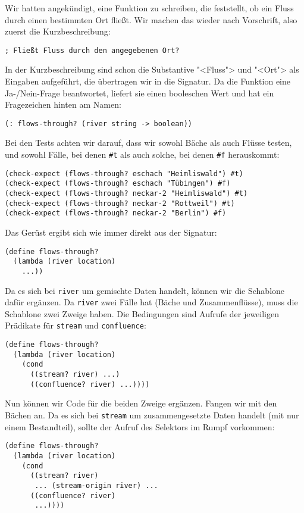%
Wir hatten angekündigt, eine Funktion zu schreiben, die feststellt, ob
ein Fluss durch einen bestimmten Ort fließt.  Wir machen das wieder
nach Vorschrift, also zuerst die Kurzbeschreibung:
%
\begin{lstlisting}
; Fließt Fluss durch den angegebenen Ort?
\end{lstlisting}
%
In der Kurzbeschreibung sind schon die Substantive "<Fluss"> und
"<Ort"> als Eingaben aufgeführt, die übertragen wir in die Signatur.
Da die Funktion eine Ja-/Nein-Frage beantwortet, liefert sie einen
booleschen Wert und hat ein Fragezeichen hinten am Namen:
%
\begin{lstlisting}
(: flows-through? (river string -> boolean))
\end{lstlisting}
%
Bei den Tests achten wir darauf, dass wir sowohl Bäche als auch Flüsse
testen, und sowohl Fälle, bei denen \lstinline{#t} als auch solche,
bei denen \lstinline{#f} herauskommt:
%
\begin{lstlisting}
(check-expect (flows-through? eschach "Heimliswald") #t)
(check-expect (flows-through? eschach "Tübingen") #f)
(check-expect (flows-through? neckar-2 "Heimliswald") #t)
(check-expect (flows-through? neckar-2 "Rottweil") #t)
(check-expect (flows-through? neckar-2 "Berlin") #f)
\end{lstlisting}
%
Das Gerüst ergibt sich wie immer direkt aus der Signatur:
%
\begin{lstlisting}
(define flows-through?
  (lambda (river location)
    ...))
\end{lstlisting}
%
Da es sich bei \lstinline{river} um gemischte Daten handelt, können
wir die Schablone dafür ergänzen.  Da \lstinline{river} zwei Fälle hat
(Bäche und Zusammenflüsse), muss die Schablone zwei Zweige haben.  Die
Bedingungen sind Aufrufe der jeweiligen Prädikate für
\lstinline{stream} und \lstinline{confluence}:
%
\begin{lstlisting}
(define flows-through?
  (lambda (river location)
    (cond
      ((stream? river) ...)
      ((confluence? river) ...))))
\end{lstlisting}
%
Nun können wir Code für die beiden Zweige ergänzen.  Fangen wir mit
den Bächen an.  Da es sich bei \lstinline{stream} um zusammengesetzte
Daten handelt (mit nur einem Bestandteil), sollte der Aufruf des
Selektors im Rumpf vorkommen:
%
\begin{lstlisting}
(define flows-through?
  (lambda (river location)
    (cond
      ((stream? river)
       ... (stream-origin river) ...
      ((confluence? river)
       ...))))
\end{lstlisting}
